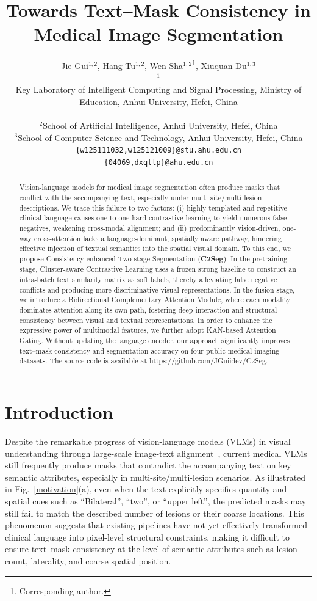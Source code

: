 \documentclass{article} %
\title{Towards Text--Mask Consistency in Medical Image Segmentation}
\author{
Jie Gui$^{1,2}$,
Hang Tu$^{1,2}$,
Wen Sha$^{1,2}$\thanks{Corresponding author.},
Xiuquan Du$^{1,3}$\footnotemark[1] \\
$^{1}$\parbox[t]{0.94\linewidth}{Key Laboratory of Intelligent Computing and Signal Processing, Ministry of Education, Anhui University, Hefei, China} \\
$^{2}$School of Artificial Intelligence, Anhui University, Hefei, China \\
$^{3}$School of Computer Science and Technology, Anhui University, Hefei, China \\
\texttt{\{w125111032,w125121009\}@stu.ahu.edu.cn} \\
\texttt{\{04069,dxqllp\}@ahu.edu.cn}
}
\begin{document}
\maketitle


\begin{abstract}
Vision-language models for medical image segmentation often produce masks that conflict with the accompanying text, especially under multi-site/multi-lesion descriptions. We trace this failure to two factors: (i) highly templated and repetitive clinical language causes one-to-one hard contrastive learning to yield numerous false negatives, weakening cross-modal alignment; and (ii) predominantly vision-driven, one-way cross-attention lacks a language-dominant, spatially aware pathway, hindering effective injection of textual semantics into the spatial visual domain. To this end, we propose Consistency-enhanced Two-stage Segmentation (\textbf{C2Seg}). In the pretraining stage, Cluster-aware Contrastive Learning uses a frozen strong baseline to construct an intra-batch text similarity matrix as soft labels, thereby alleviating false negative conflicts and producing more discriminative visual representations. In the fusion stage, we introduce a Bidirectional Complementary Attention Module, where each modality dominates attention along its own path, fostering deep interaction and structural consistency between visual and textual representations. In order to enhance the expressive power of multimodal features, we further adopt KAN-based Attention Gating. Without updating the language encoder, our approach significantly improves text--mask consistency and segmentation accuracy on four public medical imaging datasets. The source code is available at https://github.com/JGuiidev/C2Seg.
\end{abstract}

\section{Introduction}

Despite the remarkable progress of vision-language models (VLMs) in visual understanding through large-scale image-text alignment~\citep{ghosh2024exploring,li2025benchmark}, current medical VLMs still frequently produce masks that contradict the accompanying text on key semantic attributes, especially in multi-site/multi-lesion scenarios. As illustrated in Fig.~\ref{motivation}(a), even when the text explicitly specifies quantity and spatial cues such as ``Bilateral'', ``two'', or ``upper left'', the predicted masks may still fail to match the described number of lesions or their coarse locations. This phenomenon suggests that existing pipelines have not yet effectively transformed clinical language into pixel-level structural constraints, making it difficult to ensure text--mask consistency at the level of semantic attributes such as lesion count, laterality, and coarse spatial position.
\end{document}
